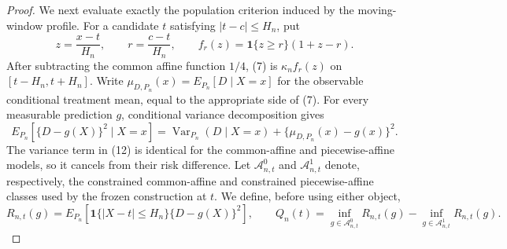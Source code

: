 \documentclass{article}
\begin{document}
\begin{proof}
We next evaluate exactly the population criterion induced by the
moving-window profile.  For a candidate \(t\) satisfying
\(|t-c|\le H_n\), put
\[
 z=\frac{x-t}{H_n},
 \qquad
 r=\frac{c-t}{H_n},
 \qquad
 f_r(z)=\mathbf 1\{z\ge r\}(1+z-r).
 \tag{11}
\]
After subtracting the common affine function \(1/4\), (7) is
\(\kappa_nf_r(z)\) on \([t-H_n,t+H_n]\).  Write
\(\mu_{D,P_n}(x)=E_{P_n}[D\mid X=x]\) for the observable conditional
treatment mean, equal to the appropriate side of (7).  For every measurable
prediction \(g\), conditional variance decomposition gives
\[
E_{P_n}[\{D-g(X)\}^2\mid X=x]
=\operatorname{Var}_{P_n}(D\mid X=x)
 +\{\mu_{D,P_n}(x)-g(x)\}^2.
\tag{12}
\]
The variance term in (12) is identical for the common-affine and
piecewise-affine models, so it cancels from their risk difference.
Let \(\mathcal A_{n,t}^0\) and \(\mathcal A_{n,t}^1\) denote,
respectively, the constrained common-affine and constrained
piecewise-affine classes used by the frozen construction at \(t\).  We
define, before using either object,
\[
 R_{n,t}(g)=E_{P_n}\!\left[
   \mathbf 1\{|X-t|\le H_n\}\{D-g(X)\}^2\right],
 \qquad
 Q_n(t)=\inf_{g\in\mathcal A_{n,t}^0}R_{n,t}(g)
       -\inf_{g\in\mathcal A_{n,t}^1}R_{n,t}(g).
\]


\end{proof}
\end{document}
